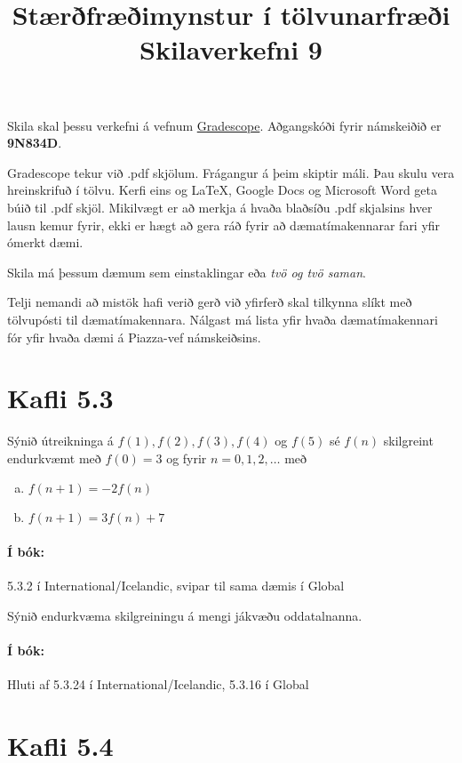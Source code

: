 \documentclass{article}
\title{Stærðfræðimynstur í tölvunarfræði \\ Skilaverkefni 9}
\author{}
\begin{document}
\maketitle

Skila skal þessu verkefni á vefnum \href{https://gradescope.com/courses/9487}{Gradescope}. Aðgangskóði fyrir námskeiðið er \textbf{9N834D}. 

Gradescope tekur við .pdf skjölum. Frágangur á þeim skiptir máli. Þau skulu vera hreinskrifuð í tölvu. Kerfi eins og \LaTeX, Google Docs og Microsoft Word geta búið til .pdf skjöl. Mikilvægt er að merkja á hvaða blaðsíðu .pdf skjalsins hver lausn kemur fyrir, ekki er hægt að gera ráð fyrir að dæmatímakennarar fari yfir ómerkt dæmi.

Skila má þessum dæmum sem einstaklingar eða \emph{tvö og tvö saman}.

Telji nemandi að mistök hafi verið gerð við yfirferð skal tilkynna slíkt með tölvupósti til dæmatímakennara. Nálgast má lista yfir hvaða dæmatímakennari fór yfir hvaða dæmi á Piazza-vef námskeiðsins.

\section{Kafli 5.3}

\question

Sýnið útreikninga á $f(1), f(2), f(3), f(4)$ og $f(5)$ sé $f(n)$ skilgreint endurkvæmt með $f(0)=3$ og fyrir $n=0, 1, 2,\ldots$ með

\begin{enumerate}[a)]
    \item $f(n+1) = -2f(n)$
    \item $f(n+1) = 3f(n)+7$
\end{enumerate}

\paragraph{Í bók:} 5.3.2 í International/Icelandic, svipar til sama dæmis í Global

\question

Sýnið endurkvæma skilgreiningu á mengi jákvæðu oddatalnanna.

\paragraph{Í bók:} Hluti af 5.3.24 í International/Icelandic, 5.3.16 í Global

\section{Kafli 5.4}
\end{document}
